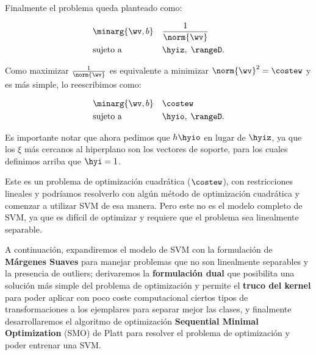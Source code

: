 Finalmente el problema queda planteado como:


\begin{equation*}
\begin{aligned}
& \minarg{\wv,b}
& &  \frac{1}{\norm{\wv}}\\
& \text{sujeto a}
& &  \hyiz, \; \rangeD.
\end{aligned}
\end{equation*}


Como maximizar $\frac{1}{\norm{\wv}}$ es equivalente a minimizar $\norm{\wv}^2 = \costew$ y es más simple, lo reescribimos como:

\begin{equation*}
\begin{aligned}
& \minarg{\wv,b}
& &  \costew \\
& \text{sujeto a}
& &  \hyio, \; \rangeD.
\end{aligned}
\end{equation*}

Es importante notar que ahora pedimos que $h\hyio$  en lugar de $\hyiz$, ya que los $\xi$ más cercanos al hiperplano son los vectores de soporte, para los cuales definimos arriba que $\hyi =1$.

Este es un problema de optimización cuadrática ($\costew$), con restricciones lineales y podríamos resolverlo con algún método de optimización cuadrática y comenzar a utilizar SVM de esa manera. Pero este no es el modelo completo de SVM, ya que es difícil de optimizar y requiere que el problema sea linealmente separable.

A continuación, expandiremos el modelo de SVM con la formulación de \textbf{Márgenes Suaves} para manejar problemas que no son linealmente separables y la presencia de outliers; derivaremos la \textbf{formulación dual} que posibilita una solución más simple del problema de optimización y permite el \textbf{truco del kernel} para poder aplicar con poco coste computacional ciertos tipos de transformaciones a los ejemplares para separar mejor las clases, y finalmente desarrollaremos el algoritmo de optimización \textbf{Sequential Minimal Optimization} (SMO) de Platt \cite{platt1998} para resolver el problema de optimización y poder entrenar una SVM.
 